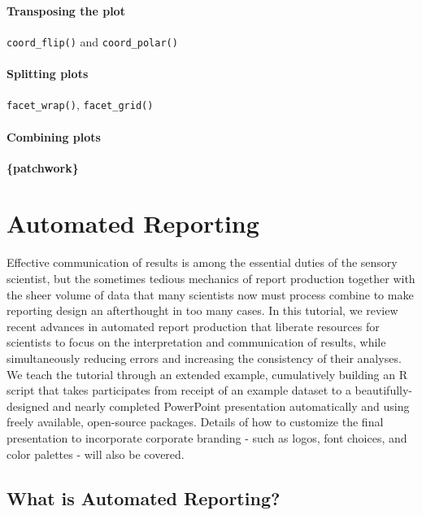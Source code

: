 \documentclass[
]{book}
\begin{document}
\hypertarget{transposing-the-plot}{%
\subsubsection{Transposing the plot}\label{transposing-the-plot}}

\texttt{coord\_flip()} and \texttt{coord\_polar()}

\hypertarget{splitting-plots}{%
\subsubsection{Splitting plots}\label{splitting-plots}}

\texttt{facet\_wrap()}, \texttt{facet\_grid()}

\hypertarget{combining-plots}{%
\subsubsection{Combining plots}\label{combining-plots}}

\textbf{\{patchwork\}}

\hypertarget{auto-report}{%
\chapter{Automated Reporting}\label{auto-report}}

Effective communication of results is among the essential duties of the sensory scientist, but the sometimes tedious mechanics of report production together with the sheer volume of data that many scientists now must process combine to make reporting design an afterthought in too many cases. In this tutorial, we review recent advances in automated report production that liberate resources for scientists to focus on the interpretation and communication of results, while simultaneously reducing errors and increasing the consistency of their analyses. We teach the tutorial through an extended example, cumulatively building an R script that takes participates from receipt of an example dataset to a beautifully-designed and nearly completed PowerPoint presentation automatically and using freely available, open-source packages. Details of how to customize the final presentation to incorporate corporate branding - such as logos, font choices, and color palettes - will also be covered.

\hypertarget{what-is-automated-reporting}{%
\section{What is Automated Reporting?}\label{what-is-automated-reporting}}
\end{document}
